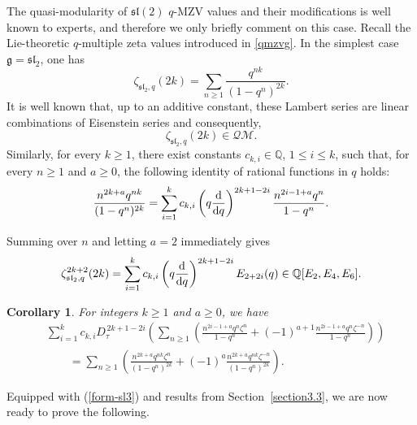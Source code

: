 \documentclass[pdftex]{sigma}
\numberwithin{equation}{section}
\newtheorem{Corollary}[Theorem]{Corollary}
\theoremstyle{definition}
\begin{document}
The quasi-modularity of $\mathfrak{sl}(2)$ $q$-MZV values and their modifications is well known to experts, and therefore we only briefly comment on this case.
Recall the Lie-theoretic $q$-multiple zeta values introduced in
\eqref{qmzvg}. In the simplest case $\mathfrak g=\mathfrak{sl}_2$, one has
\[
\zeta_{\mathfrak{sl}_2,q}(2k)
=
\sum_{n\ge1}\frac{q^{nk}}{(1-q^n)^{2k}}.
\]
It is well known that, up to an additive constant, these Lambert series are
linear combinations of Eisenstein series and consequently,
\[
\zeta_{\mathfrak{sl}_2,q}(2k)\in\mathcal{QM}.
\]
Similarly, for every $k\geq1$, there exist constants
$c_{k,i}\in\mathbb{Q}$, $1\leq i\leq k$, such that, for every
$n\geq1$ and $a\geq0$, the following identity of rational functions in $q$
holds:
\begin{equation}\label{lin-comb}
\frac{n^{2k+a}q^{nk}}{(1-q^n)^{2k}}
=
\sum_{i=1}^{k}
c_{k,i}
\left(q\frac{{\rm d}}{{\rm d}q}\right)^{2k+1-2i}
\frac{n^{2i-1+a}q^n}{1-q^n}.
\end{equation}

Summing over $n$ and letting $a=2$ immediately gives
\[
\zeta_{\mathfrak{sl}_2,q}^{2k+2}(2k)=\sum_{i=1}^{k} c_{k,i} \left(q \frac{{\rm d}}{{\rm d}q}\right)^{2k+1-2i} E_{2+2i}(q) \in \mathbb{Q}[E_2,E_4,E_6].
\]

\begin{Corollary}
For integers $k\geq1$ and $a\geq0$, we have
\begin{align}
&\sum_{i=1}^{k} c_{k,i}
D_\tau^{\,2k+1-2i}
\left(
\sum_{n\geq1}
\left(
\frac{n^{2i-1+a}q^n\zeta^n}{1-q^n}
+
(-1)^{a+1}
\frac{n^{2i-1+a}q^n\zeta^{-n}}{1-q^n}
\right)
\right)\nonumber
\\
&\qquad =
\sum_{n\geq1}
\left(
\frac{n^{2k+a}q^{nk}\zeta^n}{(1-q^n)^{2k}}
+
(-1)^a
\frac{n^{2k+a}q^{nk}\zeta^{-n}}{(1-q^n)^{2k}}
\right).\label{form-sl3}
\end{align}
\end{Corollary}
Equipped with (\ref{form-sl3}) and results from Section~\ref{section3.3}, we are now ready to prove the following.
\end{document}
